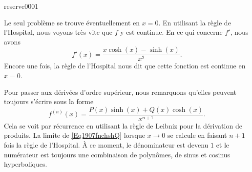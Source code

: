 

\begin{corrige}{reserve0001}

	Le seul problème se trouve éventuellement en $x=0$. En utilisant la règle de l'Hospital, nous voyons très vite que $f$ y est continue. En ce qui concerne $f'$, nous avons
	\begin{equation}
		f'(x)=\frac{ x\cosh(x)-\sinh(x) }{ x^2 }.
	\end{equation}
	Encore une fois, la règle de l'Hospital nous dit que cette fonction est continue en $x=0$.

	Pour passer aux dérivées d'ordre supérieur, nous remarquons qu'elles peuvent toujours s'écrire sous la forme
	\begin{equation}	\label{Eq1907fnchshQ}
		f^{(n)}(x)=\frac{ P(x)\sinh(x)+Q(x)\cosh(x) }{ x^{n+1} }.
	\end{equation}
	Cela se voit par récurrence en utilisant la règle de Leibniz pour la dérivation de produits. La limite de \eqref{Eq1907fnchshQ} lorsque $x\to 0$ se calcule en faisant $n+1$ fois la règle de l'Hospital. À ce moment, le dénominateur est devenu $1$ et le numérateur est toujours une combinaison de polynômes, de sinus et cosinus hyperboliques.

\end{corrige}
